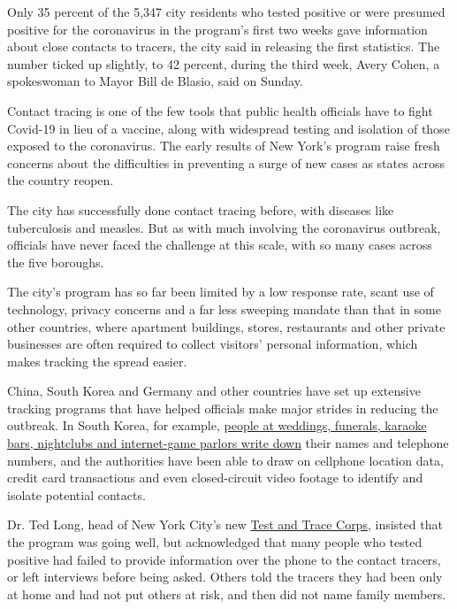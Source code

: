 Only 35 percent of the 5,347 city residents who tested positive or were
presumed positive for the coronavirus in the program's first two weeks
gave information about close contacts to tracers, the city said in
releasing the first statistics. The number ticked up slightly, to 42
percent, during the third week, Avery Cohen, a spokeswoman to Mayor Bill
de Blasio, said on Sunday.

Contact tracing is one of the few tools that public health officials
have to fight Covid-19 in lieu of a vaccine, along with widespread
testing and isolation of those exposed to the coronavirus. The early
results of New York's program raise fresh concerns about the
difficulties in preventing a surge of new cases as states across the
country reopen.

The city has successfully done contact tracing before, with diseases
like tuberculosis and measles. But as with much involving the
coronavirus outbreak, officials have never faced the challenge at this
scale, with so many cases across the five boroughs.

The city's program has so far been limited by a low response rate, scant
use of technology, privacy concerns and a far less sweeping mandate than
that in some other countries, where apartment buildings, stores,
restaurants and other private businesses are often required to collect
visitors' personal information, which makes tracking the spread easier.

China, South Korea and Germany and other countries have set up extensive
tracking programs that have helped officials make major strides in
reducing the outbreak. In South Korea, for example,
\href{https://www.nytimes.com/2020/05/09/world/asia/coronavirus-south-korea-second-wave.html}{people
at weddings, funerals, karaoke bars, nightclubs and internet-game
parlors write down} their names and telephone numbers, and the
authorities have been able to draw on cellphone location data, credit
card transactions and even closed-circuit video footage to identify and
isolate potential contacts.

Dr. Ted Long, head of New York City's new
\href{https://www.nychealthandhospitals.org/test-and-trace/}{Test and
Trace Corps}, insisted that the program was going well, but acknowledged
that many people who tested positive had failed to provide information
over the phone to the contact tracers, or left interviews before being
asked. Others told the tracers they had been only at home and had not
put others at risk, and then did not name family members.

